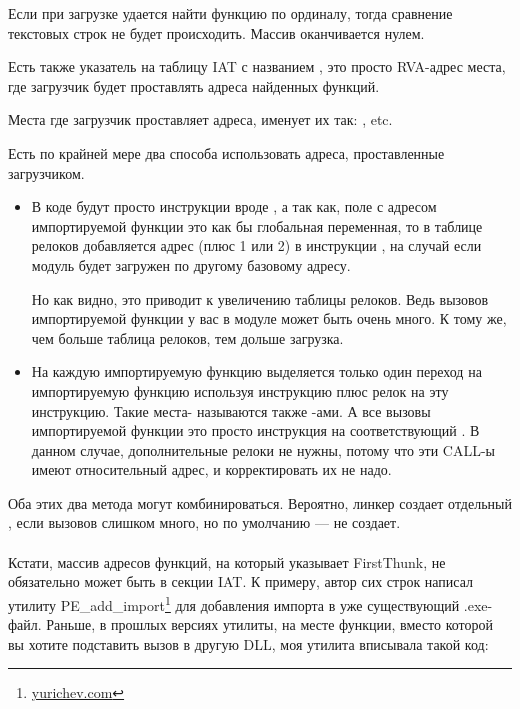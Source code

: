 Если при загрузке удается найти функцию по ординалу, тогда сравнение текстовых строк не будет происходить.
Массив оканчивается нулем.

Есть также указатель на таблицу \ac{IAT} с названием , это просто \ac{RVA}-адрес места, где загрузчик будет проставлять адреса найденных функций.

Места где загрузчик проставляет адреса, \IDA именует их так: , etc.

Есть по крайней мере два способа использовать адреса, проставленные загрузчиком.

\begin{itemize}
\item
В коде будут просто инструкции вроде , а так как, поле с адресом импортируемой функции это как бы глобальная переменная, 
то в таблице релоков добавляется адрес (плюс 1 или 2) в инструкции ,
на случай если модуль будет загружен по другому базовому адресу.

Но как видно, это приводит к увеличению таблицы релоков.
Ведь вызовов импортируемой функции у вас в модуле может быть очень много.
К тому же, чем больше таблица релоков, тем дольше загрузка.

\item
На каждую импортируемую функцию выделяется только один переход на импортируемую функцию используя
инструкцию \JMP плюс релок на эту инструкцию.
Такие места- называются также -ами.
А все вызовы импортируемой функции это просто инструкция \CALL на соответствующий .
В данном случае, дополнительные релоки не нужны, потому что эти CALL-ы имеют относительный адрес,
и корректировать их не надо.
\end{itemize}

Оба этих два метода могут комбинироваться.
Вероятно, линкер создает отдельный , если вызовов слишком много, но по умолчанию --- не создает. \\
\\
Кстати, массив адресов функций, на который указывает FirstThunk,
не обязательно может быть в секции \ac{IAT}.
К примеру, автор сих строк написал утилиту
PE\_add\_import\footnote{\href{http://go.yurichev.com/17049}{yurichev.com}} 
для добавления импорта в уже существующий .exe-файл.
Раньше, в прошлых версиях утилиты, на месте функции, вместо которой вы хотите подставить вызов в другую DLL,
моя утилита вписывала такой код:

